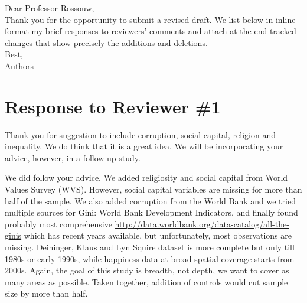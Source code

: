 \noindent Dear Professor Rossouw,\\

\noindent Thank you for the opportunity to submit a revised draft.
We list below in inline format my brief responses to reviewers'
 comments and attach at the end tracked changes that
 show precisely the additions and deletions.\\

\noindent Best,\\
Authors
\vspace{.5in}






 
\newpage
\section{Response to Reviewer \#1} 



Thank you for suggestion to include corruption, social capital, religion and
inequality. We do think that it is a great idea. We will be incorporating your
advice, however, in a follow-up study.  

We did follow your
advice. We added religiosity and social capital from World Values Survey
(WVS). However, social capital variables are missing for more than half of the
sample. We also added corruption from the World
Bank and we tried multiple sources for Gini: World Bank Development Indicators, 
and finally found probably most comprehensive
\url{http://data.worldbank.org/data-catalog/all-the-ginis} which has recent
years available, but unfortunately, most observations are missing. Deininger,
Klaus and Lyn Squire dataset is more complete but only till 1980s or early
1990s, while happiness data at broad spatial coverage starts from 2000s.
Again, the goal of this study is breadth, not depth, we want to cover as many
areas as possible. Taken together, addition of controls would cut sample size by
more than half. %
\\

